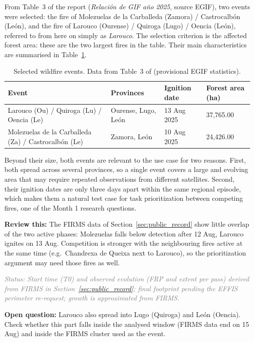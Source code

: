 \documentclass[11pt]{article}
\newcommand{\openquestion}[1]{\textcolor{openq}{\textbf{Open question:}} #1}
\newcommand{\status}[1]{\textit{\textcolor{gray}{Status: #1}}}
\newcommand{\review}[1]{\textcolor{review}{\textbf{Review this:}} #1}
\begin{document}
From Table~3 of the report (\emph{Relación de GIF año 2025}, source EGIF), two events were selected: the fire of Molezuelas de la Carballeda (Zamora) / Castrocalbón (León), and the fire of Larouco (Ourense) / Quiroga (Lugo) / Oencia (León), referred to from here on simply as \emph{Larouco}. The selection criterion is the affected forest area: these are the two largest fires in the table. Their main characteristics are summarised in Table~\ref{tab:events}.

\begin{table}[h]
\centering
\begin{tabular}{p{4.6cm} p{2.6cm} p{2.0cm} p{2.6cm}}
\hline
Event & Provinces & Ignition date & Forest area (ha) \\
\hline
Larouco (Ou) / Quiroga (Lu) / Oencia (Le) & Ourense, Lugo, León & 13 Aug 2025 & 37,765.00 \\
Molezuelas de la Carballeda (Za) / Castrocalbón (Le) & Zamora, León & 10 Aug 2025 & 24,426.00 \\
\hline
\end{tabular}
\caption{Selected wildfire events. Data from Table~3 of \cite{miteco2025avance} (provisional EGIF statistics).}
\label{tab:events}
\end{table}

Beyond their size, both events are relevant to the use case for two reasons. First, both spread across several provinces, so a single event covers a large and evolving area that may require repeated observations from different satellites. Second, their ignition dates are only three days apart within the same regional episode, which makes them a natural test case for task prioritization between competing fires, one of the Month 1 research questions.

\review{The FIRMS data of Section~\ref{sec:public_record} show little overlap of the two active phases: Molezuelas falls below detection after 12 Aug, Larouco ignites on 13 Aug. Competition is stronger with the neighbouring fires active at the same time (e.g.\ Chandrexa de Queixa next to Larouco), so the prioritization argument may need those fires as well.}

\status{Start time (T0) and observed evolution (FRP and extent per pass) derived from FIRMS in Section~\ref{sec:public_record}; final footprint pending the EFFIS perimeter re-request; growth is approximated from FIRMS.}

\openquestion{Larouco also spread into Lugo (Quiroga) and Le\'on (Oencia). Check whether this part falls inside the analysed window (FIRMS data end on 15 Aug) and inside the FIRMS cluster used as the event.}
\end{document}
